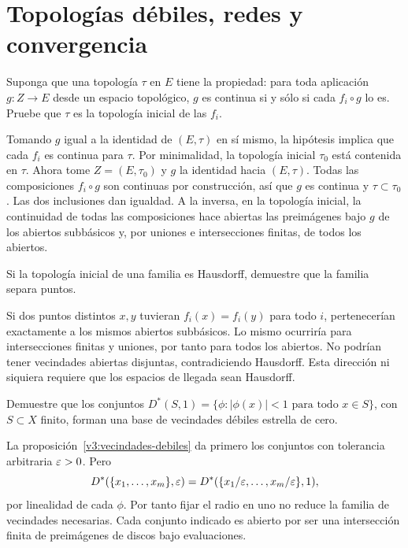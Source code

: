 \chapter{Topologías débiles, redes y convergencia}

\begin{ejercicio}\label{ej:v3-l13-1}
Suponga que una topología $\tau$ en $E$ tiene la propiedad: para toda aplicación $g:Z\to E$ desde un espacio topológico, $g$ es continua si y sólo si cada $f_i\circ g$ lo es. Pruebe que $\tau$ es la topología inicial de las $f_i$.
\end{ejercicio}
\begin{solucion}
Tomando $g$ igual a la identidad de $(E,\tau)$ en sí mismo, la hipótesis implica que cada $f_i$ es continua para $\tau$. Por minimalidad, la topología inicial $\tau_0$ está contenida en $\tau$. Ahora tome $Z=(E,\tau_0)$ y $g$ la identidad hacia $(E,\tau)$. Todas las composiciones $f_i\circ g$ son continuas por construcción, así que $g$ es continua y $\tau\subset\tau_0$. Las dos inclusiones dan igualdad. A la inversa, en la topología inicial, la continuidad de todas las composiciones hace abiertas las preimágenes bajo $g$ de los abiertos subbásicos y, por uniones e intersecciones finitas, de todos los abiertos.
\end{solucion}

\begin{ejercicio}\label{ej:v3-l13-2}
Si la topología inicial de una familia es Hausdorff, demuestre que la familia separa puntos.
\end{ejercicio}
\begin{solucion}
Si dos puntos distintos $x,y$ tuvieran $f_i(x)=f_i(y)$ para todo $i$, pertenecerían exactamente a los mismos abiertos subbásicos. Lo mismo ocurriría para intersecciones finitas y uniones, por tanto para todos los abiertos. No podrían tener vecindades abiertas disjuntas, contradiciendo Hausdorff. Esta dirección ni siquiera requiere que los espacios de llegada sean Hausdorff.
\end{solucion}

\begin{ejercicio}\label{ej:v3-l13-3}
Demuestre que los conjuntos $D^*(S,1)=\{\phi:|\phi(x)|<1\text{ para todo }x\in S\}$, con $S\subset X$ finito, forman una base de vecindades débiles estrella de cero.
\end{ejercicio}
\begin{solucion}
La proposición~\ref{v3:vecindades-debiles} da primero los conjuntos con tolerancia arbitraria $\varepsilon>0$. Pero
\[D^*(\{x_1,\ldots,x_m\},\varepsilon)
=D^*(\{x_1/\varepsilon,\ldots,x_m/\varepsilon\},1),
\]
por linealidad de cada $\phi$. Por tanto fijar el radio en uno no reduce la familia de vecindades necesarias. Cada conjunto indicado es abierto por ser una intersección finita de preimágenes de discos bajo evaluaciones.
\end{solucion}

